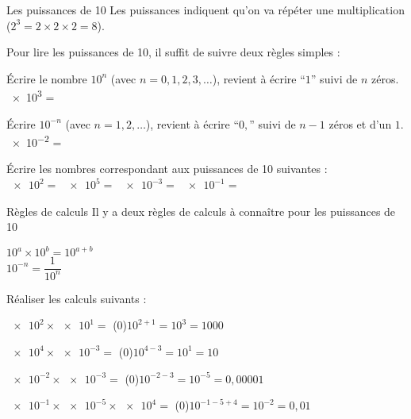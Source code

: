 \tetePremStssMeth
\vspace*{-36pt}


\vspace*{-20pt}

\begin{doc}{Les puissances de 10}
  Les puissances indiquent qu'on va répéter une multiplication ($2^3 = 2 \times 2 \times 2 = 8$).
  
  Pour lire les puissances de 10, il suffit de suivre deux règles simples :
  \begin{importants}
    \pointCyan Écrire le nombre $10^n$ (avec $n = 0, 1, 2, 3, \ldots$), revient à écrire ``$1$'' suivi de $n$ zéros. \\
    \exemple \num{e3} =

    \pointCyan Écrire $10^{-n}$ (avec $n = 1, 2, \ldots$), revient à écrire ``$0,$'' suivi de $n - 1$ zéros et d'un $1$. \\
    \exemple \num{e-2} =
  \end{importants}
\end{doc}

\numeroQuestion Écrire les nombres correspondant aux puissances de 10 suivantes : \\
$\num{e2}  =$  \qq{}
$\num{e5}  =$  \qq{}
$\num{e-3} =$  \qq{}
$\num{e-1} =$ 

\begin{doc}{Règles de calculs}
  Il y a deux règles de calculs à connaître pour les puissances de 10
  \begin{importants}
    \pointCyan $10^a \times 10^b = 10^{a + b}$ \\   
    \pointCyan $10^{-n} = \dfrac{1}{10^n}$
  \end{importants}
\end{doc}


\numeroQuestion Réaliser les calculs suivants :
\pasCorrection{\vspace*{-4pt}}
\begin{listePoints}[2]
  \setlength\itemsep{-4pt}
  \item $\num{e2} \times \num{e1}  =$ \texteTrou(0){$10^{2 + 1} = 10^3 = 1000$}
  \item $\num{e4} \times \num{e-3} =$ \texteTrou(0){$10^{4 - 3} = 10^1 = 10$}
  \item $\num{e-2}\times \num{e-3} =$ \texteTrou(0){$10^{-2 -3} = 10^{-5} = 0,00001$}
  \item $\num{e-1}\times \num{e-5}\times \num{e4}=$ \texteTrou(0){$10^{-1 -5 +4} = 10^{-2} = 0,01$}
\end{listePoints}


